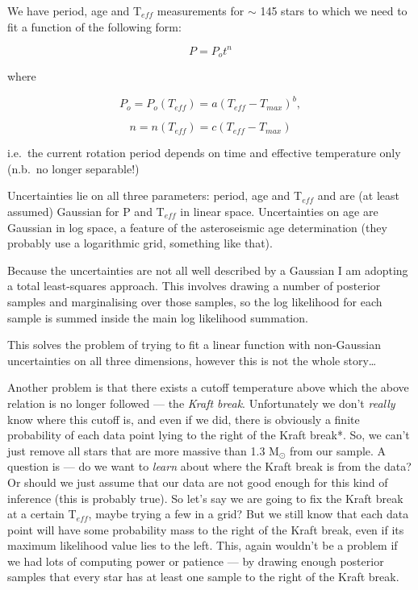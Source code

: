 \documentclass[12pt,preprint]{aastex}
\begin{document}
We have period, age and T$_{eff}$ measurements for $\sim$ 145 stars to which we need to fit a function of the following form:

\begin{equation}
P = P_ot^n
\end{equation}

where

\begin{equation}
P_o = P_o(T_{eff}) = a(T_{eff} - T_{max})^b,
\end{equation}

\begin{equation}
n = n(T_{eff}) = c(T_{eff} - T_{max})
\end{equation}

i.e.\ the current rotation period depends on time and effective temperature only (n.b.\ no longer separable!)

Uncertainties lie on all three parameters: period, age and T$_{eff}$ and are (at least assumed) Gaussian for P and T$_{eff}$ in linear space.
Uncertainties on age are Gaussian in log space, a feature of the asteroseismic age determination (they probably use a logarithmic grid, something like that).

Because the uncertainties are not all well described by a Gaussian I am adopting a total least-squares approach.
This involves drawing a number of posterior samples and marginalising over those samples, so the log likelihood for each sample is summed inside the main log likelihood summation.

This solves the problem of trying to fit a linear function with non-Gaussian uncertainties on all three dimensions, however this is not the whole story\ldots

Another problem is that there exists a cutoff temperature above which the above relation is no longer followed --- the \emph{Kraft break}.
Unfortunately we don't \emph{really} know where this cutoff is, and even if we did, there is obviously a finite probability of each data point lying to the right of the Kraft break*.
So, we can't just remove all stars that are more massive than 1.3 M$_{\odot}$ from our sample.
A question is --- do we want to \emph{learn} about where the Kraft break is from the data?
Or should we just assume that our data are not good enough for this kind of inference (this is probably true).
So let's say we are going to fix the Kraft break at a certain T$_{eff}$, maybe trying a few in a grid?
But we still know that each data point will have some probability mass to the right of the Kraft break, even if its maximum likelihood value lies to the left.
This, again wouldn't be a problem if we had lots of computing power or patience --- by drawing enough posterior samples that every star has at least one sample to the right of the Kraft break.
\end{document}
